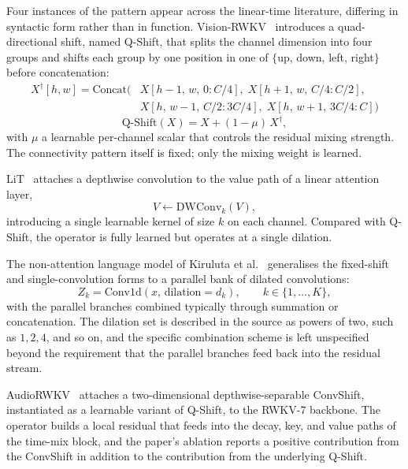 Four instances of the pattern appear across the linear-time literature,
differing in syntactic form rather than in function.
Vision-RWKV~\cite{duan2024visionrwkv} introduces a quad-directional
shift, named Q-Shift, that splits the channel dimension into four
groups and shifts each group by one position in one of $\{$up, down,
left, right$\}$ before concatenation:
\begin{equation}\label{eq:qshift-shift}
\begin{split}
X^{\dagger}[h, w] = \mathrm{Concat}\big(
&X[h{-}1,\, w,\, 0{:}C/4],\; X[h{+}1,\, w,\, C/4{:}C/2], \\
&X[h,\, w{-}1,\, C/2{:}3C/4],\; X[h,\, w{+}1,\, 3C/4{:}C]\big)
\end{split}
\end{equation}
\begin{equation}\label{eq:qshift-mix}
\mathrm{Q\text{-}Shift}(X) = X + (1 - \mu) \, X^{\dagger},
\end{equation}
with $\mu$ a learnable per-channel scalar that controls the residual
mixing strength. The connectivity pattern itself is fixed; only the
mixing weight is learned.

LiT~\cite{wang2025lit} attaches a depthwise convolution to the value
path of a linear attention layer,
\begin{equation}\label{eq:lit-vconv}
V \leftarrow \mathrm{DWConv}_{k}(V),
\end{equation}
introducing a single learnable kernel of size $k$ on each channel.
Compared with Q-Shift, the operator is fully learned but operates at a
single dilation.

The non-attention language model of Kiruluta et
al.~\cite{kiruluta2025breaking} generalises the fixed-shift and
single-convolution forms to a parallel bank of dilated convolutions:
\begin{equation}\label{eq:multi-resolution}
Z_{k} = \mathrm{Conv1d}(x,\, \mathrm{dilation} = d_{k}), \qquad k \in \{1, \ldots, K\},
\end{equation}
with the parallel branches combined typically through summation or
concatenation. The dilation set is described in the source as powers
of two, such as $1, 2, 4$, and so on, and the specific combination
scheme is left unspecified beyond the requirement that the parallel
branches feed back into the residual stream.

AudioRWKV~\cite{xiong2025audiorwkv} attaches a two-dimensional
depthwise-separable ConvShift, instantiated as a learnable variant of
Q-Shift, to the RWKV-7 backbone. The operator builds a local residual
that feeds into the decay, key, and value paths of the time-mix
block, and the paper's ablation reports a positive contribution from
the ConvShift in addition to the contribution from the underlying
Q-Shift.

